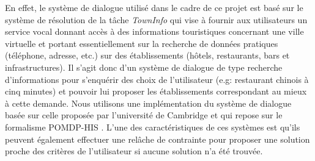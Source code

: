 \documentclass[a4paper,11pt,twoside]{StyleThese}
\begin{document}
En effet, le système de dialogue utilisé dans le cadre de ce projet est basé sur le système de résolution de la tâche \textit{TownInfo} qui vise à fournir aux utilisateurs un service vocal donnant accès à des
informations touristiques concernant une ville virtuelle et portant essentiellement sur la
recherche de données pratiques (téléphone, adresse, etc.) sur des établissements (hôtels,
restaurants, bars et infrastructures). Il s'agit donc d'un système de dialogue de type recherche d'informations pour s'enquérir des choix de l'utilisateur (e.g: restaurant chinois à cinq minutes) et pouvoir lui proposer les établissements correspondant au mieux à cette demande. 
Nous utilisons une implémentation
du système de dialogue basée sur celle proposée par l’université de Cambridge et qui repose
sur le formalisme POMDP-HIS \cite{Young10}.
L'une des caractéristiques de ces systèmes est qu'ils peuvent également effectuer une relâche de contrainte pour proposer une solution proche des critères de l'utilisateur si aucune solution n'a été trouvée.
\end{document}
